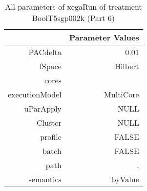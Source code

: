 \begin{table}[ht]
\centering
\begin{tabular}{rr}
  \hline
 & Parameter Values \\ 
  \hline
PACdelta & 0.01 \\ 
  fSpace & Hilbert \\ 
  cores &  \\ 
  executionModel & MultiCore \\ 
  uParApply & NULL \\ 
  Cluster & NULL \\ 
  profile & FALSE \\ 
  batch & FALSE \\ 
  path & . \\ 
  semantics & byValue \\ 
   \hline
\end{tabular}
\caption{ All parameters of xegaRun of treatment BoolT5sgp002k 
 (Part 6)} 
\end{table}
